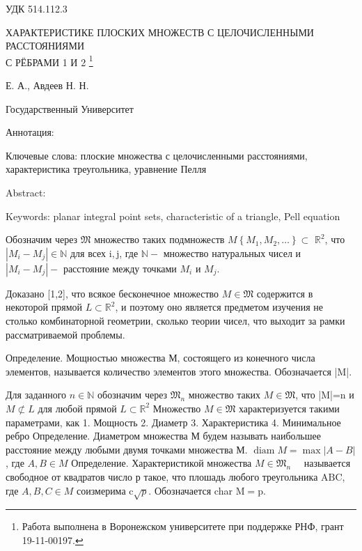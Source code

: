 \documentclass[a4paper,openbib]{article}
\begin{document}
\noindent УДК 514.112.3


\begin{center}
	 ХАРАКТЕРИСТИКЕ ПЛОСКИХ МНОЖЕСТВ С ЦЕЛОЧИСЛЕННЫМИ РАССТОЯНИЯМИ\\С РЁБРАМИ 1 И 2
	\footnote{
		Работа выполнена в Воронежском университете при поддержке РНФ, грант 19-11-00197.
	}

	 Е. А., Авдеев Н. Н.

	 Государственный Университет
\end{center}

Аннотация:

Ключевые слова:
	плоские множества с целочисленными расстояниями,
	характеристика треугольника,
	уравнение Пелля

Abstract:

Keywords:
	planar integral point sets,
	characteristic of a triangle,
	Pell equation




Обозначим через $\mathfrak{M}$ множество таких подмножеств $M\left\{M_{1}, M_{2}, \ldots\right\} \subset$ $\mathbb{R}^{2}$, что $\left|M_{i}-M_{j}\right| \in \mathbb{N}$ для всех $\mathrm{i}, \mathrm{j}$, где $\mathbb{N}-$ множество натуральных чисел и $\left|M_{i}-M_{j}\right|-$ расстояние между точками $M_{i}$ и $M_{j} .$




Доказано [1,2], что всякое бесконечное множество $M \in \mathfrak{M}$ содержится в некоторой прямой $L \subset \mathbb{R}^{2}$, и поэтому оно является предметом изучения не столько комбинаторной геометрии, сколько теории чисел, что выходит за рамки рассматриваемой проблемы.

Определение. Мощностью множества М, состоящего из конечного
числа элементов, называется количество элементов этого множества. Обозначается |M|.

Для заданного $n \in \mathbb{N}$ обозначим через $\mathfrak{M}_{n}$ множество таких $M \in \mathfrak{M}$, что |M|=n и $M \not \subset L$ для любой прямой $L \subset \mathbb{R}^{2}$ Множество $M \in \mathfrak{M}$ характеризуется такими параметрами, как
1. Мощность
2. Диаметр
3. Характеристика
4. Минимальное ребро Определение. Диаметром множества М будем называть наибольшее расстояние между любыми двумя точками множества М.
$\operatorname{diam} M=\max |A-B|$, где $A, B \in M$
Определение. Характеристикой множества $M \in \mathfrak{M}_{n} \quad$ называется свободное от квадратов число р такое, что плошадь любого треугольника $\mathrm{ABC}$, где $A, B, C \in M$ соизмерима $\mathrm{c} \sqrt{p} .$ Обозначается char $\mathrm{M}=\mathrm{p} .$
\end{document}
